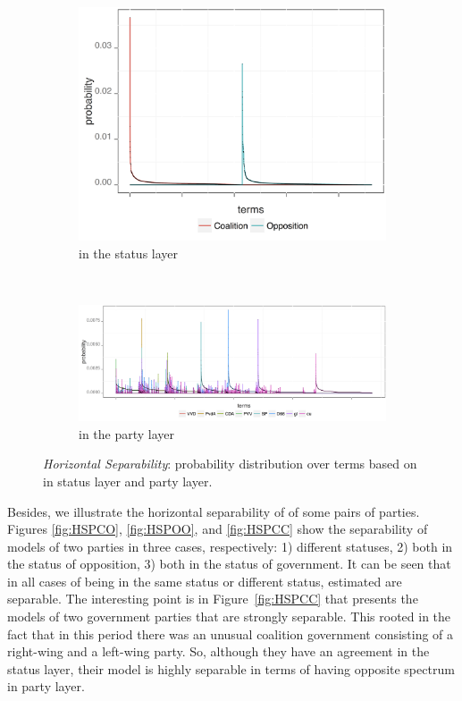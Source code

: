\begin{figure}[t]
    \centering
    \begin{subfigure}[b]{0.32\textwidth}
\includegraphics[width=\linewidth]{02-part-01/chapter-03/figs_and_tables/img_opo-coa.png}
\caption{\label{fig:HSS}\achswlm in the status layer}
        \end{subfigure}
        ~ 
    \begin{subfigure}[b]{0.64\textwidth}
\includegraphics[width=\linewidth]{02-part-01/chapter-03/figs_and_tables/img_parties.png}
\caption{\label{fig:HSP}\achswlm in the party layer}
        \end{subfigure}
    \caption{\label{fig:HS} \emph{Horizontal Separability}: probability distribution over terms based on \hswlms in status layer and party layer.}
\end{figure}

Besides, we illustrate the horizontal separability of \achswlm of some pairs of parties. Figures \ref{fig:HSPCO}, \ref{fig:HSPOO}, and \ref{fig:HSPCC} show the separability of models of two parties in three cases, respectively: 1) different statuses, 2) both in the status of opposition, 3) both in the status of government. It can be seen that in all cases of being in the same status or different status, estimated \hswlms are separable. The interesting point is in Figure~\ref{fig:HSPCC} that presents the models of two government parties that are strongly separable. This rooted in the fact that in this period there was an unusual coalition government consisting of a right\:-\:wing and a left\:-\:wing party. So, although they have an agreement in the status layer, their model is highly separable in terms of having opposite spectrum in party layer.


